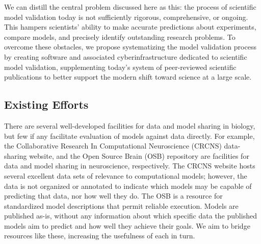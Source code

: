 \documentclass[11pt,letterpaper]{article}
\begin{document}
We can distill the central problem discussed here as this: the process of scientific model validation today is not sufficiently rigorous, comprehensive, or ongoing. This hampers scientists' ability to make accurate predictions about experiments, compare models, and precisely identify outstanding research problems. To overcome these obstacles, we propose systematizing the model validation process by creating software and associated cyberinfrastructure dedicated to scientific model validation, supplementing today's system of peer-reviewed scientific publications to better support the modern shift toward science at a large scale.

\subsection{Existing Efforts}\label{sec:existing_efforts}
There are several well-developed facilities for data and model sharing in biology, but few if any facilitate evaluation of models against data directly.  For example, the Collaborative Research In Computational Neuroscience (CRCNS) data-sharing website\cite{crcns_url}, and the Open Source Brain (OSB) repository\cite{osb_url} are facilities for data and model sharing in neuroscience, respectively.  The CRCNS website hosts several excellent data sets of relevance to computational models; however, the data is not organized or annotated to indicate which models may be capable of predicting that data, nor how well they do.  The OSB is a resource for standardized model descriptions that permit reliable execution. Models are published as-is, without any information about which specific data the published models aim to predict and how well they achieve their goals. We aim to bridge resources like these, increasing the usefulness of each in turn.
\end{document}
